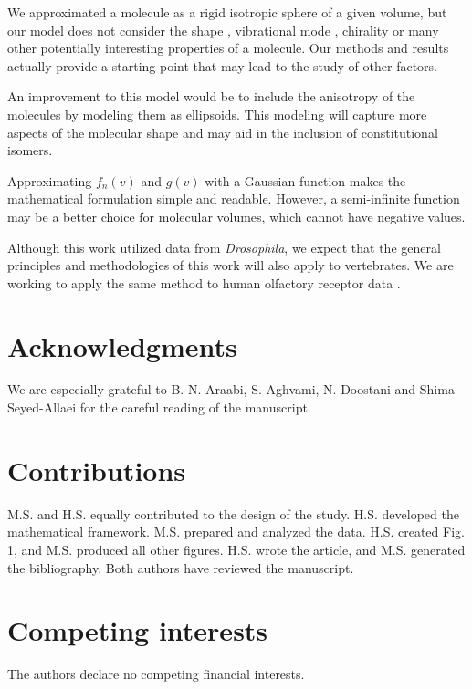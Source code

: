 \documentclass[fleqn,11pt]{wlscirep}
\begin{document}
We approximated a molecule as a rigid isotropic sphere of a given volume, but
our model does not consider the shape \cite{Keller2004, Araneda2000, uchida2000}, 
vibrational mode \cite{Turin,Franco2011,turin2015plausibility}, 
chirality \cite{tirandaz2015dissipative} or many other potentially interesting properties of a molecule.
Our methods and results actually provide a starting point that may lead to the study of other factors. 

An improvement to this model would be to include the anisotropy of the molecules 
by modeling them as ellipsoids. 
This modeling will capture more aspects of the molecular shape and may aid in the inclusion of constitutional isomers. 

Approximating $f_n(v)$ and $g(v)$ with a Gaussian function makes the mathematical formulation simple and readable. 
However, a semi-infinite function may be a better choice for molecular volumes, which cannot have negative values.

Although this work utilized data from \textit{Drosophila}, 
we expect that the general principles and methodologies of this work will also apply to vertebrates. 
We are working to apply the same method to human olfactory receptor data \cite{mainland2015human}.

\section*{Acknowledgments}
We are especially grateful to B. N. Araabi, S. Aghvami, N. Doostani and Shima Seyed-Allaei for the careful reading of the manuscript.



\section*{Contributions}

M.S. and H.S. equally contributed to the design of the study. H.S. developed the mathematical framework. M.S. prepared and analyzed the data. H.S. created Fig. 1, and M.S. produced all other figures. H.S. wrote the article, and M.S. generated the bibliography. Both authors have reviewed the manuscript.

\section*{Competing interests}
The authors declare no competing financial interests.
\end{document}
